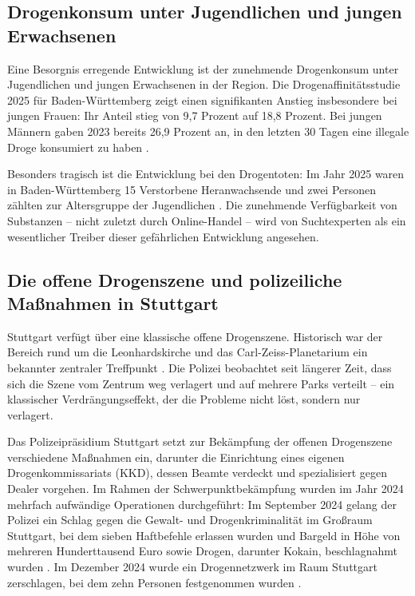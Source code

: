 \documentclass[11pt,a4paper]{article}
\begin{document}
	\subsection{Drogenkonsum unter Jugendlichen und jungen Erwachsenen}
	
	Eine Besorgnis erregende Entwicklung ist der zunehmende Drogenkonsum unter Jugendlichen und jungen Erwachsenen in der Region. Die Drogenaffinitätsstudie 2025 für Baden-Württemberg zeigt einen signifikanten Anstieg insbesondere bei jungen Frauen: Ihr Anteil stieg von 9,7 Prozent auf 18,8 Prozent. Bei jungen Männern gaben 2023 bereits 26,9 Prozent an, in den letzten 30 Tagen eine illegale Droge konsumiert zu haben \cite{drogenaffinitaetsstudie}.
	
	Besonders tragisch ist die Entwicklung bei den Drogentoten: Im Jahr 2025 waren in Baden-Württemberg 15 Verstorbene Heranwachsende und zwei Personen zählten zur Altersgruppe der Jugendlichen \cite{drogentote-2025}. Die zunehmende Verfügbarkeit von Substanzen – nicht zuletzt durch Online-Handel – wird von Suchtexperten als ein wesentlicher Treiber dieser gefährlichen Entwicklung angesehen.
	
	\subsection{Die offene Drogenszene und polizeiliche Maßnahmen in Stuttgart}
	
	Stuttgart verfügt über eine klassische offene Drogenszene. Historisch war der Bereich rund um die Leonhardskirche und das Carl-Zeiss-Planetarium ein bekannter zentraler Treffpunkt \cite{drogenszene-stuttgart}. Die Polizei beobachtet seit längerer Zeit, dass sich die Szene vom Zentrum weg verlagert und auf mehrere Parks verteilt \cite{drogenszene-verlagerung} – ein klassischer Verdrängungseffekt, der die Probleme nicht löst, sondern nur verlagert.
	
	Das Polizeipräsidium Stuttgart setzt zur Bekämpfung der offenen Drogenszene verschiedene Maßnahmen ein, darunter die Einrichtung eines eigenen Drogenkommissariats (KKD), dessen Beamte verdeckt und spezialisiert gegen Dealer vorgehen. Im Rahmen der Schwerpunktbekämpfung wurden im Jahr 2024 mehrfach aufwändige Operationen durchgeführt: Im September 2024 gelang der Polizei ein Schlag gegen die Gewalt- und Drogenkriminalität im Großraum Stuttgart, bei dem sieben Haftbefehle erlassen wurden und Bargeld in Höhe von mehreren Hunderttausend Euro sowie Drogen, darunter Kokain, beschlagnahmt wurden \cite{razzia-stuttgart-sep24}. Im Dezember 2024 wurde ein Drogennetzwerk im Raum Stuttgart zerschlagen, bei dem zehn Personen festgenommen wurden \cite{drogennetzwerk-stuttgart}.
	
\end{document}
